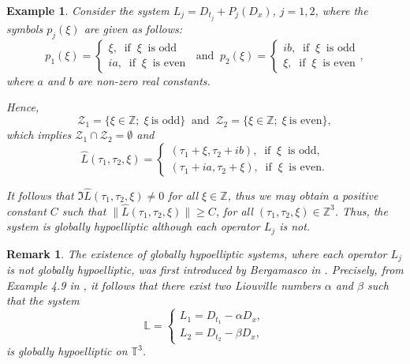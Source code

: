 \documentclass[12pt]{elsarticle}
\newtheorem{example}[theorem]{Example}
\newtheorem{remark}[theorem]{Remark}
\numberwithin{equation}{section}
\begin{document}
\begin{example}\label{example const coeff}
	Consider the system $L_j = D_{t_j} + P_j(D_x)$,  $j=1,2$, where the symbols $p_j(\xi)$ are given as follows: 
	\begin{equation*}
	p_1(\xi)  =
	\left \{
	\begin{array}{l}
	\xi, \ \textrm{ if } \ \xi \ \textrm{ is odd} \\
	ia, \ \textrm{ if } \ \xi \ \textrm{ is even} 
	\end{array}
	\right.	
   \ \textrm{ and } \
   	p_2(\xi)  =
   \left \{
   \begin{array}{l}
   ib, \ \textrm{ if } \ \xi \ \textrm{ is odd} \\
   \xi, \ \textrm{ if } \ \xi \ \textrm{ is even}
   \end{array},
   \right.
	\end{equation*}
	where $a$ and $b$ are non-zero real constants.
	
	Hence,  
	$$
	\mathcal{Z}_1 = \{\xi \in \mathbb{Z}; \; \xi \ \textrm{is odd}\}
	\ \textrm{ and } \
	\mathcal{Z}_2 = \{\xi \in \mathbb{Z};\; \xi \ \textrm{is even}\},
	$$
	which implies $\mathcal{Z}_1\cap \mathcal{Z}_2 = \emptyset$ and 
	\begin{equation*}
	\widehat{L}(\tau_1,\tau_2,\xi) = 
	\left \{
	\begin{array}{l}
	(\tau_1 + \xi , \tau_2 + ib), \ \textrm{ if } \ \xi \ \textrm{ is odd}, \\
	(\tau_1 + ia , \tau_2 + \xi), \ \textrm{ if } \ \xi \ \textrm{ is even}. 
	\end{array}
	\right.
	\end{equation*}
	
	It follows that $\Im \widehat{L}(\tau_1,\tau_2,\xi) \neq 0$  for all $\xi \in \mathbb{Z}$, thus we may obtain a positive constant $C$ such that $\|\widehat{L}(\tau_1,\tau_2,\xi)\| \geq C$, for all $(\tau_1, \tau_2, \xi) \in \mathbb{Z}^3$. Thus, the system is globally hypoelliptic although each operator $L_j$ is not.
\end{example}

\begin{remark}\label{remark-berg}
The existence of globally hypoelliptic systems, where each ope\-ra\-tor $L_j$ is not globally hypoelliptic, was first	introduced by Bergamasco  in \cite{BERG99}. Precisely, from Example 4.9 in \cite{BERG99}, it follows  that there exist two Liouville numbers $\alpha$ and $\beta$ such that the system
$$
\mathbb{L} =
\left \{
\begin{array}{l}
L_1 = D_{t_1} - \alpha D_x, \\
L_2 = D_{t_2} - \beta D_x,
\end{array}
\right.
$$
is globally hypoelliptic on $\mathbb{T}^3$.
\end{remark}	
\end{document}
